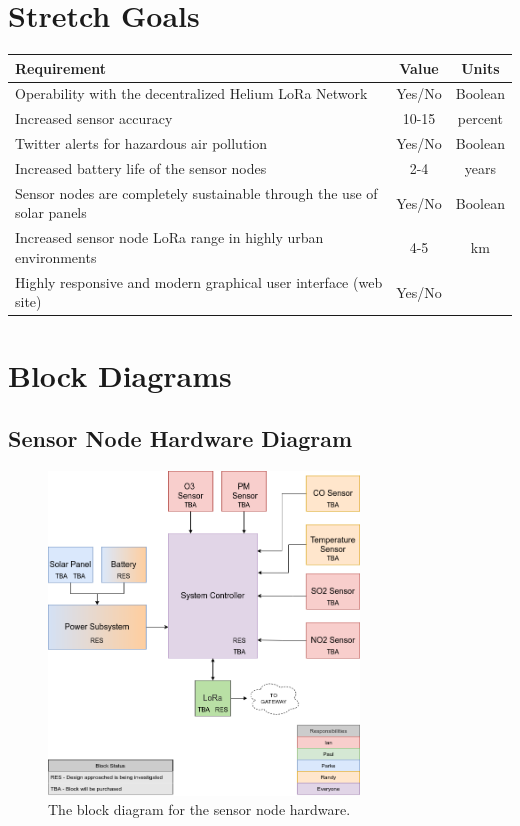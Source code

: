 \documentclass[titlepage, 11pt, letterpaper]{article}
\begin{document}
\section{Stretch Goals}
\begin{tabularx}{\linewidth}{|X|c|c|}
\hline
Requirement & Value & Units \\
\hline
\hline

Operability with the decentralized Helium LoRa Network & Yes/No & Boolean \\\hline
Increased sensor accuracy & 10-15 & percent \\\hline
Twitter alerts for hazardous air pollution & Yes/No & Boolean \\\hline
Increased battery life of the sensor nodes & 2-4 & years \\\hline
Sensor nodes are completely sustainable through the use of solar panels & Yes/No & Boolean \\\hline
Increased sensor node LoRa range in highly urban environments & 4-5 & km \\\hline
Highly responsive and modern graphical user interface (web site) & Yes/No & \\\hline

\end{tabularx}


\section{Block Diagrams}

\subsection{Sensor Node Hardware Diagram}
\begin{figure}[H]
    \centering
    \includegraphics[width=3.25in]{"./hwNodeBD.png"} 
    \caption{The block diagram for the sensor node hardware.}
    \label{fig:hwNodeBD}
\end{figure}
\end{document}
